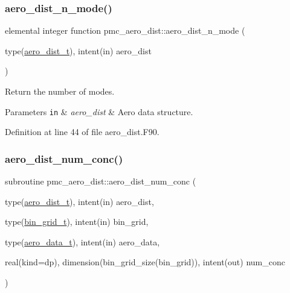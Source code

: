 \subsubsection{\texorpdfstring{aero\+\_\+dist\+\_\+n\+\_\+mode()}{aero\_dist\_n\_mode()}}
{\footnotesize\ttfamily elemental integer function pmc\+\_\+aero\+\_\+dist\+::aero\+\_\+dist\+\_\+n\+\_\+mode (\begin{DoxyParamCaption}\item[{type(\mbox{\hyperlink{structpmc__aero__dist_1_1aero__dist__t}{aero\+\_\+dist\+\_\+t}}), intent(in)}]{aero\+\_\+dist }\end{DoxyParamCaption})}



Return the number of modes. 


\begin{DoxyParams}[1]{Parameters}
\mbox{\tt in}  & {\em aero\+\_\+dist} & Aero data structure. \\
\hline
\end{DoxyParams}


Definition at line 44 of file aero\+\_\+dist.\+F90.

\mbox{\label{namespacepmc__aero__dist_a59a20aa0065ae63e35a55c8079ce9d66}} 
\subsubsection{\texorpdfstring{aero\+\_\+dist\+\_\+num\+\_\+conc()}{aero\_dist\_num\_conc()}}
{\footnotesize\ttfamily subroutine pmc\+\_\+aero\+\_\+dist\+::aero\+\_\+dist\+\_\+num\+\_\+conc (\begin{DoxyParamCaption}\item[{type(\mbox{\hyperlink{structpmc__aero__dist_1_1aero__dist__t}{aero\+\_\+dist\+\_\+t}}), intent(in)}]{aero\+\_\+dist,  }\item[{type(\mbox{\hyperlink{structpmc__bin__grid_1_1bin__grid__t}{bin\+\_\+grid\+\_\+t}}), intent(in)}]{bin\+\_\+grid,  }\item[{type(\mbox{\hyperlink{structpmc__aero__data_1_1aero__data__t}{aero\+\_\+data\+\_\+t}}), intent(in)}]{aero\+\_\+data,  }\item[{real(kind=dp), dimension(bin\+\_\+grid\+\_\+size(bin\+\_\+grid)), intent(out)}]{num\+\_\+conc }\end{DoxyParamCaption})}



